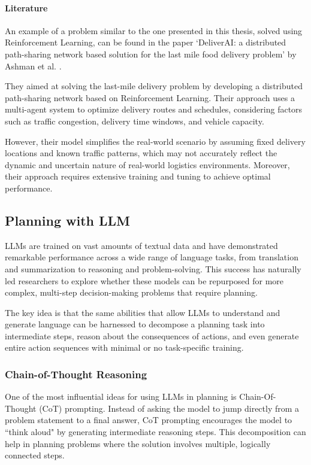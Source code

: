 \paragraph{Literature}
An example of a problem similar to the one presented in this thesis, solved
using Reinforcement Learning, can be found in the paper `DeliverAI: a distributed
path-sharing network based solution for the last mile food delivery problem' by
Ashman et al. \cite{mehra2024deliveraireinforcementlearningbased}.

They aimed at solving the last-mile delivery problem by developing a distributed
path-sharing network based on Reinforcement Learning. Their approach uses a
multi-agent system to optimize delivery routes and schedules, considering factors
such as traffic congestion, delivery time windows, and vehicle capacity.

However, their model simplifies the real-world scenario by assuming fixed
delivery locations and known traffic patterns, which may not accurately reflect the
dynamic and uncertain nature of real-world logistics environments. Moreover, their
approach requires extensive training and tuning to achieve optimal performance.

\subsection{Planning with LLM}
\label{sub:planning_in_llm}

LLMs are trained on vast amounts of textual data and have demonstrated
remarkable performance across a wide range of language tasks, from translation and
summarization to reasoning and problem-solving. This success has naturally led
researchers to explore whether these models can be repurposed for more complex, multi-step
decision-making problems that require planning.

The key idea is that the same abilities that allow LLMs to understand and generate
language can be harnessed to decompose a planning task into intermediate steps,
reason about the consequences of actions, and even generate entire action sequences
with minimal or no task-specific training.

\subsubsection{Chain-of-Thought Reasoning}

One of the most influential ideas for using LLMs in planning is Chain-Of-Thought
(CoT) prompting. Instead of asking the model to jump directly from a problem statement
to a final answer, CoT prompting encourages the model to ``think aloud" by generating
intermediate reasoning steps. This decomposition can help in planning problems
where the solution involves multiple, logically connected steps.

